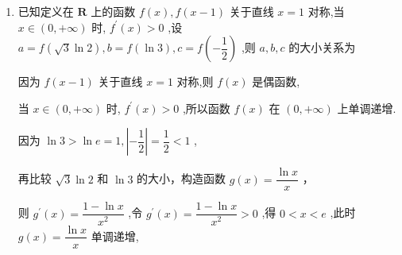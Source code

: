 \begin{enumerate}
\begin{enumerate}
        \begin{jieda}
            记 $g\left( x\right)  = {{e}}^{x} - {{e}}^{-x} - {2x},x \in  \left\lbrack  {-3,3}\right\rbrack$ ,则 $g\left( {-x}\right)  = {{e}}^{-x} - {{e}}^{x} + {2x} =  - g\left( x\right)$，故 $g\left( x\right)$ 为 $\left\lbrack  {-3,3}\right\rbrack$ 的奇函数
            
            因为${g}^{\prime }\left( x\right)  = {{e}}^{x} + {{e}}^{-x} - 2 \geq  2\sqrt{{{e}}^{x}{{e}}^{-x}} - 2 = 0$，所以$g\left( x\right)$ 为 $\left\lbrack  {-3,3}\right\rbrack$ 上的单调递增函数
            
            因为 $f\left( x\right)  = g\left( x\right)  + 1$，由 $f\left( {m}^{2}\right)  + f\left( {m - 2}\right)  \leq  2$ 可得 $g\left( {m}^{2}\right)  + g\left( {m - 2}\right)  + 2 \leq  2$ ,进而 $g\left( {m}^{2}\right)  \leq  g\left( {2 - m}\right)$ ,
            
            故 $- 3 \leq  {m}^{2} \leq  2 - m \leq  3$ ，解得 $- 1 \leq  m \leq  1$
        \end{jieda}
        
        \item 已知定义在 $\mathbf{R}$ 上的函数 $f\left( x\right) ,f\left( {x - 1}\right)$ 关于直线 $x = 1$ 对称,当 $x \in  \left( {0, + \infty }\right)$ 时, ${f}^{\prime }\left( x\right)  > 0$ ,设 $a = f\left( {\sqrt{3}\ln 2}\right) ,b = f\left( {\ln 3}\right) ,c = f\left( {-\dfrac{1}{2}}\right)$ ,则 $a,b,c$ 的大小关系为

        \begin{jieda}
            因为 $f\left( {x - 1}\right)$ 关于直线 $x = 1$ 对称,则 $f\left( x\right)$ 是偶函数,
            
            当 $x \in  \left( {0, + \infty }\right)$ 时, ${f}^{\prime }\left( x\right)  > 0$ ,所以函数 $f\left( x\right)$ 在 $\left( {0, + \infty }\right)$ 上单调递增.
            
            因为 $\ln 3 > \ln {e} = 1,\left| {-\dfrac{1}{2}}\right|  = \dfrac{1}{2} < 1$ ,
            
            再比较 $\sqrt{3}\ln 2$ 和 $\ln 3$ 的大小，构造函数 $g\left( x\right)  = \dfrac{\ln x}{x}$ ，
            
            则 ${g}^{\prime }\left( x\right)  = \dfrac{1 - \ln x}{{x}^{2}}$ ,令 ${g}^{\prime }\left( x\right)  = \dfrac{1 - \ln x}{{x}^{2}} > 0$ ,得 $0 < x < {e}$ ,此时 $g\left( x\right)  = \dfrac{\ln x}{x}$ 单调递增,
            

\end{jieda}
\end{enumerate}
\end{enumerate}
